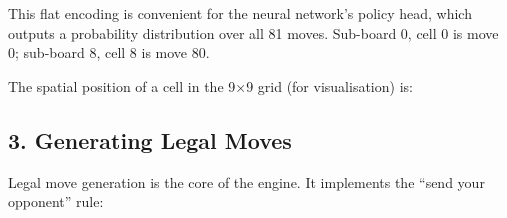 This flat encoding is convenient for the neural network's policy head,
which outputs a probability distribution over all 81 moves. Sub-board 0,
cell 0 is move 0; sub-board 8, cell 8 is move 80.

The spatial position of a cell in the 9×9 grid (for visualisation) is:

\begin{Shaded}
\begin{Highlighting}[]
\OperatorTok{=}
\OperatorTok{=}\OperatorTok{//} \NormalTok{) }\OperatorTok{*}  \OperatorTok{+}\OperatorTok{//} \NormalTok{)}
\OperatorTok{=}\OperatorTok{\%} \NormalTok{) }\OperatorTok{*}  \OperatorTok{+}\OperatorTok{\%} \NormalTok{)}
\end{Highlighting}
\end{Shaded}

\hypertarget{generating-legal-moves}{%
\subsection{3. Generating Legal Moves}\label{generating-legal-moves}}

Legal move generation is the core of the engine. It implements the
``send your opponent'' rule:

